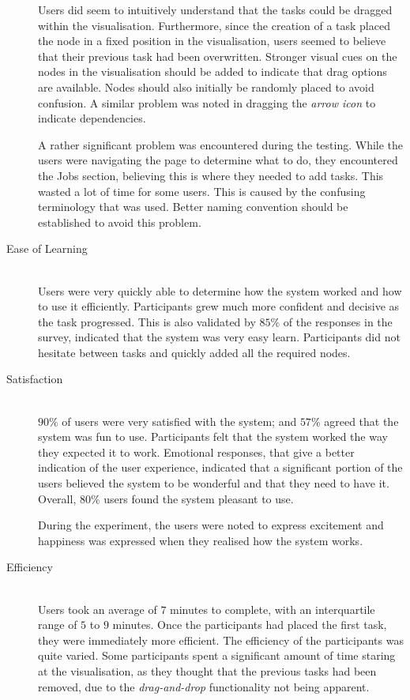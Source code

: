 \begin{description}
    Users did seem to intuitively understand that the tasks could be dragged
    within
    the visualisation. Furthermore, since the creation of a task placed the node
    in a fixed position in the visualisation, users seemed to believe that their previous task
    had been overwritten. Stronger visual cues on the nodes in the visualisation
    should be added to indicate that drag options are available. Nodes should
    also initially be randomly placed to avoid confusion. A similar problem was
    noted in dragging the \emph{arrow icon} to indicate dependencies.

    A rather significant problem was encountered during the testing. While
    the users were navigating the page to determine what to do, they encountered
    the Jobs section, believing this is where they needed to add tasks. This
    wasted a lot of time for some users. This is caused by the confusing
    terminology that was used. Better naming convention should be established to avoid
    this problem.
\item[Ease of Learning] \hfill \\
    Users were very quickly able to determine how the system worked and how to
    use it efficiently. Participants grew much more confident and decisive as
    the task progressed. This is also validated by $85\%$ of the responses in
    the survey, indicated that the system was very easy learn.
    Participants did not hesitate between tasks and quickly added all the
    required nodes.
\item[Satisfaction] \hfill \\
    $90\%$ of users were very satisfied with the system; and $57\%$ agreed
    that the  system was fun to use.
    Participants felt that the system worked the way
    they expected it to work. Emotional responses, that give a better indication of the user
    experience, indicated that a significant portion of the users believed the
    system to be wonderful and that they need to have it. Overall, $80\%$
    users found
    the system pleasant to use.

    During the experiment, the users were noted to express excitement and
    happiness was expressed when they realised how the system works.


\item[Efficiency] \hfill \\
    Users took an average of $7$ minutes to complete, with an interquartile range
    of $5$ to $9$ minutes. Once the participants had placed the first task, they
    were immediately more efficient. The efficiency of the participants was
    quite varied. Some participants spent a significant amount of time
    staring at the visualisation, as they thought that the previous tasks had
    been removed, due to the \emph{drag-and-drop} functionality not being
    apparent.
\end{description}

